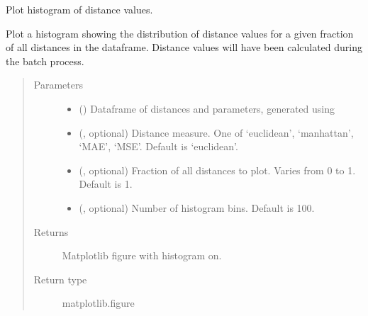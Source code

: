 \documentclass[letterpaper,10pt,english]{sphinxmanual}
\begin{document}

\begin{fulllineitems}
\label{\detokenize{misc:bayescmd.results_handling.histogram_plot}}
Plot histogram of distance values.

Plot a histogram showing the distribution of distance values for a given
fraction of all distances in the dataframe. Distance values will have been
calculated during the batch process.
\begin{quote}\begin{description}
\item[{Parameters}] \leavevmode\begin{itemize}
\item {} 
 () \textendash{} Dataframe of distances and parameters, generated using
{\hyperref[\detokenize{misc:bayescmd.results_handling.data_import}]{}}

\item {} 
 (, optional) \textendash{} Distance measure. One of ‘euclidean’, ‘manhattan’, ‘MAE’, ‘MSE’.
Default is ‘euclidean’.

\item {} 
 (, optional) \textendash{} Fraction of all distances to plot. Varies from 0 to 1. Default is 1.

\item {} 
 (, optional) \textendash{} Number of histogram bins. Default is 100.

\end{itemize}

\item[{Returns}] \leavevmode
Matplotlib figure with histogram on.

\item[{Return type}] \leavevmode
matplotlib.figure

\end{description}\end{quote}

\end{fulllineitems}

\end{document}
